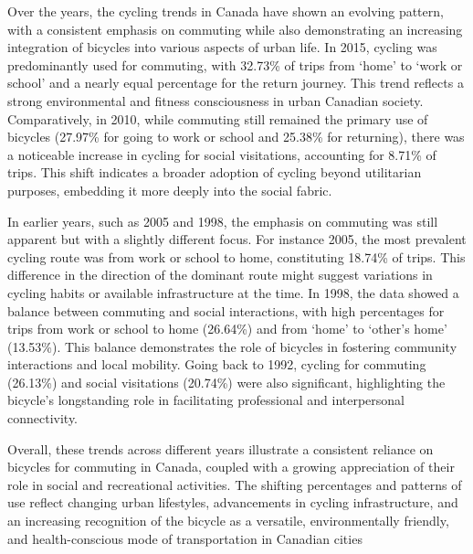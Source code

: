 \documentclass[
11pt, %
oneside, %
english, %
singlespacing, %
]{macthesis} %
\begin{document}
Over the years, the cycling trends in Canada have shown an evolving pattern, with a consistent emphasis on commuting while also demonstrating an increasing integration of bicycles into various aspects of urban life. In 2015, cycling was predominantly used for commuting, with 32.73\% of trips from `home' to `work or school' and a nearly equal percentage for the return journey. This trend reflects a strong environmental and fitness consciousness in urban Canadian society. Comparatively, in 2010, while commuting still remained the primary use of bicycles (27.97\% for going to work or school and 25.38\% for returning), there was a noticeable increase in cycling for social visitations, accounting for 8.71\% of trips. This shift indicates a broader adoption of cycling beyond utilitarian purposes, embedding it more deeply into the social fabric.

In earlier years, such as 2005 and 1998, the emphasis on commuting was still apparent but with a slightly different focus. For instance 2005, the most prevalent cycling route was from work or school to home, constituting 18.74\% of trips. This difference in the direction of the dominant route might suggest variations in cycling habits or available infrastructure at the time. In 1998, the data showed a balance between commuting and social interactions, with high percentages for trips from work or school to home (26.64\%) and from `home' to `other's home' (13.53\%). This balance demonstrates the role of bicycles in fostering community interactions and local mobility. Going back to 1992, cycling for commuting (26.13\%) and social visitations (20.74\%) were also significant, highlighting the bicycle's longstanding role in facilitating professional and interpersonal connectivity.

Overall, these trends across different years illustrate a consistent reliance on bicycles for commuting in Canada, coupled with a growing appreciation of their role in social and recreational activities. The shifting percentages and patterns of use reflect changing urban lifestyles, advancements in cycling infrastructure, and an increasing recognition of the bicycle as a versatile, environmentally friendly, and health-conscious mode of transportation in Canadian cities
\end{document}
